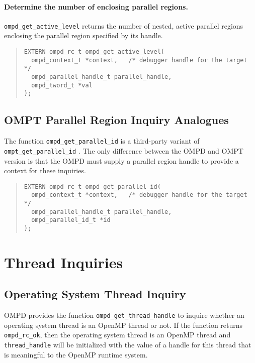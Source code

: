 \documentclass{article}
\begin{document}
\paragraph{Determine the number of enclosing  parallel regions.}
\verb|ompd_get_active_level| returns the number of nested, active
parallel regions enclosing the parallel region specified by its handle.

\begin{quote}
\begin{verbatim}
EXTERN ompd_rc_t ompd_get_active_level(
  ompd_context_t *context,   /* debugger handle for the target */
  ompd_parallel_handle_t parallel_handle, 
  ompd_tword_t *val
); 
\end{verbatim}
\end{quote}

\subsection{OMPT Parallel Region Inquiry Analogues}

The function  \verb|ompd_get_parallel_id| is a third-party variant of \verb|ompt_get_parallel_id| .
The only difference between the OMPD and OMPT version is that the OMPD  must supply a parallel region handle to provide a context for these inquiries.

\begin{quote}
\begin{verbatim}
EXTERN ompd_rc_t ompd_get_parallel_id(
  ompd_context_t *context,   /* debugger handle for the target */
  ompd_parallel_handle_t parallel_handle, 
  ompd_parallel_id_t *id
);
\end{verbatim}
\end{quote}
  
\section{Thread Inquiries}

\subsection{Operating System Thread Inquiry}

OMPD provides the function \verb|ompd_get_thread_handle| to inquire whether an operating system thread is an OpenMP thread or not. If the function returns \verb|ompd_rc_ok|, then the operating system thread is an OpenMP thread and \verb|thread_handle| will be initialized with the value of a handle for this thread that is meaningful to the OpenMP runtime system.
\end{document}
